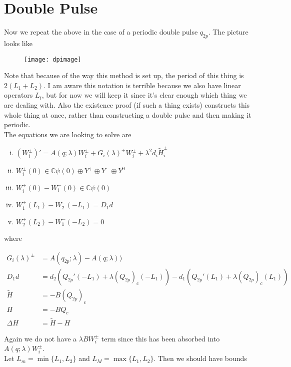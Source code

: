 \documentclass[12pt]{article}
\def\C{{\mathbb C}}
\begin{document}
\section*{Double Pulse}

Now we repeat the above in the case of a periodic double pulse $q_{2p}$. The picture looks like

\begin{figure}[H]
\texttt{[image: dpimage]}
\end{figure}

Note that because of the way this method is set up, the period of this thing is $2(L_1 + L_2)$. I am aware this notation is terrible because we also have linear operators $L_i$, but for now we will keep it since it's clear enough which thing we are dealing with. Also the existence proof (if such a thing exists) constructs this whole thing at once, rather than constructing a double pulse and then making it periodic. \\

The equations we are looking to solve are

\begin{enumerate}[(i)]
\item $(W_i^\pm)' = A(q; \lambda) W_i^\pm + G_i(\lambda)^\pm W_i^\pm + \lambda^2 d_i \tilde{H}_i^\pm$
\item $W_i^\pm(0) \in \C \psi(0) \oplus Y^+ \oplus Y^- \oplus Y^0$
\item $W_i^+(0) - W_i^-(0) \in \C \psi(0) $
\item $W_1^+(L_1) - W_2^-(-L_1) = D_1 d $
\item $W_2^+(L_2) - W_1^-(-L_2) = 0$
\end{enumerate}

where

\begin{align*}
G_i(\lambda)^\pm &= A(q_{2p};\lambda) - A(q;\lambda)) \\
D_1 d &= d_2(Q_{2p}'(-L_1) + \lambda (Q_{2p})_c(-L_1)) 
- d_1 ( Q_{2p}'(L_1) + \lambda (Q_{2p})_c(L_1) ) \\
\tilde{H} &= -B(Q_{2p})_c \\
H &= -B Q_c \\
\Delta H &= \tilde{H} - H
\end{align*}

Again we do not have a $\lambda B W_i^\pm$ term since this has been absorbed into $A(q; \lambda) W_i^\pm$. \\

Let $L_m = \min\{ L_1, L_2 \}$ and $L_M = \max\{ L_1, L_2 \}$. Then we should have bounds
\end{document}
